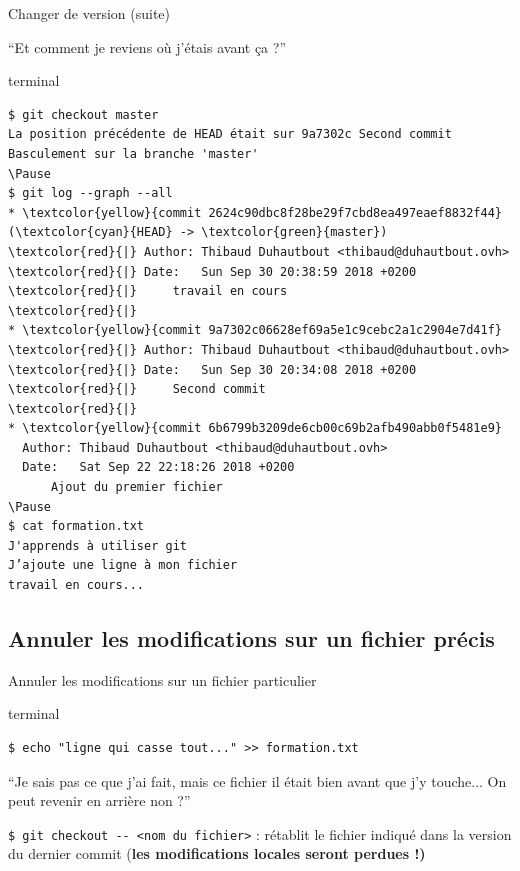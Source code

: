 \documentclass[usepdftitle=false]{beamer}
\def\seplength{.3\topsep}
\newcommand{\Pause}{%
\ifdef{\Release}
  {\pause}
  {}
}
\begin{document}
\begin{frame}[fragile]{Changer de version (suite)}
	\begin{block}{}
		\enquote{Et comment je reviens où j'étais avant ça ?}
	\end{block}
	\Pause
	\begin{beamercolorbox}[rounded=true,shadow=true]{terminal}
\vspace{-\seplength}
\begin{Verbatim}
$ git checkout master
La position précédente de HEAD était sur 9a7302c Second commit
Basculement sur la branche 'master'
\Pause
$ git log --graph --all
* \textcolor{yellow}{commit 2624c90dbc8f28be29f7cbd8ea497eaef8832f44} (\textcolor{cyan}{HEAD} -> \textcolor{green}{master})
\textcolor{red}{|} Author: Thibaud Duhautbout <thibaud@duhautbout.ovh>
\textcolor{red}{|} Date:   Sun Sep 30 20:38:59 2018 +0200
\textcolor{red}{|}     travail en cours
\textcolor{red}{|}
* \textcolor{yellow}{commit 9a7302c06628ef69a5e1c9cebc2a1c2904e7d41f}
\textcolor{red}{|} Author: Thibaud Duhautbout <thibaud@duhautbout.ovh>
\textcolor{red}{|} Date:   Sun Sep 30 20:34:08 2018 +0200
\textcolor{red}{|}     Second commit
\textcolor{red}{|}
* \textcolor{yellow}{commit 6b6799b3209de6cb00c69b2afb490abb0f5481e9}
  Author: Thibaud Duhautbout <thibaud@duhautbout.ovh>
  Date:   Sat Sep 22 22:18:26 2018 +0200
      Ajout du premier fichier
\Pause
$ cat formation.txt
J'apprends à utiliser git
J’ajoute une ligne à mon fichier
travail en cours...
\end{Verbatim}
	\end{beamercolorbox}
\end{frame}

\subsection{Annuler les modifications sur un fichier précis}

\begin{frame}[fragile]{Annuler les modifications sur un fichier particulier}

\begin{beamercolorbox}[rounded=true,shadow=true]{terminal}
\vspace{-\seplength}
\begin{Verbatim}
$ echo "ligne qui casse tout..." >> formation.txt
\end{Verbatim}
\end{beamercolorbox}

\Pause

\bigskip

	\begin{block}{}
		\enquote{Je sais pas ce que j'ai fait, mais ce fichier il était bien avant que j'y touche... On peut revenir en arrière non ?}
	\end{block}

\bigskip

\Pause

	\verb+$ git checkout -- <nom du fichier>+ : rétablit le fichier indiqué dans la version du dernier commit (\bf{les modifications locales seront perdues !})

\end{frame}
\end{document}
